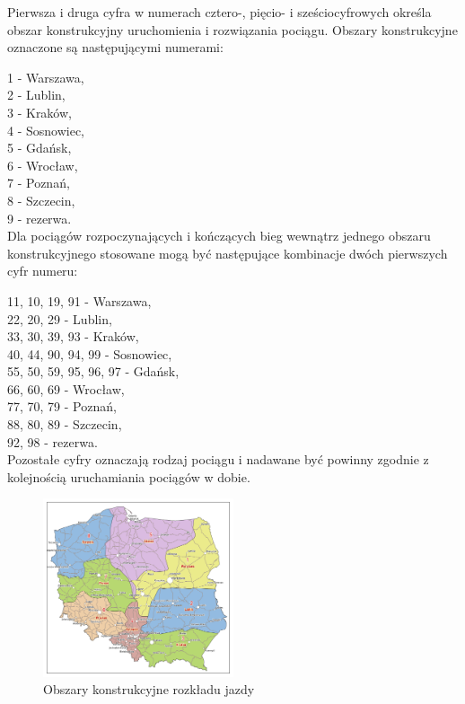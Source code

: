 Pierwsza i druga cyfra w numerach cztero-, pięcio- i sześciocyf­rowych określa obszar konstruk­cyjny urucho­mienia i rozwią­zania pociągu. Obszary konstruk­cyjne ozna­czone są nastę­pują­cymi numerami:

1 - Warszawa,\\
2 - Lublin,\\
3 - Kraków,\\
4 - Sosnowiec,\\
5 - Gdańsk,\\
6 - Wrocław,\\
7 - Poznań,\\
8 - Szczecin,\\
9 - rezerwa.\\

Dla pociągów rozpoczyna­jących i kończących bieg wewnątrz jednego obszaru konstrukcyj­nego stoso­wane mogą być następu­jące kombi­nacje dwóch pierwszych cyfr numeru:

11, 10, 19, 91 - Warszawa,\\
22, 20, 29 - Lublin,\\
33, 30, 39, 93 - Kraków,\\
40, 44, 90, 94, 99 - Sosnowiec,\\
55, 50, 59, 95, 96, 97 - Gdańsk,\\
66, 60, 69 - Wrocław,\\
77, 70, 79 - Poznań,\\
88, 80, 89 - Szczecin,\\
92, 98 - rezerwa.\\
Pozostałe cyfry ozna­czają rodzaj pociągu i nada­wane być powinny zgodnie z kolej­nością urucha­miania pociągów w dobie.
\begin{figure}
	\includegraphics[width=0.5\textwidth]{skryptkierownik-img/obszary-konstrukcyjne.png}	
	\caption{Obszary konstrukcyjne rozkładu jazdy}
\end{figure}

